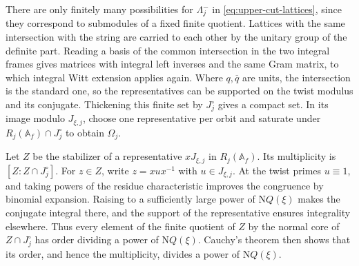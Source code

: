 There are only finitely many possibilities for \(\Lambda_j^-\)
in \eqref{eq:upper-cut-lattices}, since they correspond to
submodules of a fixed finite quotient.
Lattices with the same intersection with the string are carried
to each other by the unitary group of the definite part.
Reading a basis of the common intersection in the two integral
frames gives matrices with integral left inverses and the same
Gram matrix, to which integral Witt extension applies again.
Where \(q,\overline q\) are units, the intersection is the standard
one, so the representatives can be supported on the twist modulus
and its conjugate. Thickening this finite set by \(J^\circ_j\) gives
a compact set. In its image modulo \(J_{\xi,j}\), choose one
representative per orbit and saturate under
\(R_j(\mathbb A_f)\cap J^\circ_j\) to obtain \(\Omega_j\).

Let \(Z\) be the stabilizer of a representative \(xJ_{\xi,j}\) in
\(R_j(\mathbb A_f)\). Its multiplicity is \([Z:Z\cap J^\circ_j]\).
For \(z\in Z\), write \(z=xu x^{-1}\) with \(u\in J_{\xi,j}\).
At the twist primes \(u\equiv1\), and taking powers of the residue
characteristic improves the congruence by binomial expansion.
Raising to a sufficiently large power of \(\mathrm NQ(\xi)\)
makes the conjugate integral there, and the support of the
representative ensures integrality elsewhere.
Thus every element of the finite quotient of \(Z\) by the normal
core of \(Z\cap J^\circ_j\) has order dividing a power of
\(\mathrm NQ(\xi)\). Cauchy's theorem then shows that its order,
and hence the multiplicity, divides a power of \(\mathrm NQ(\xi)\).

